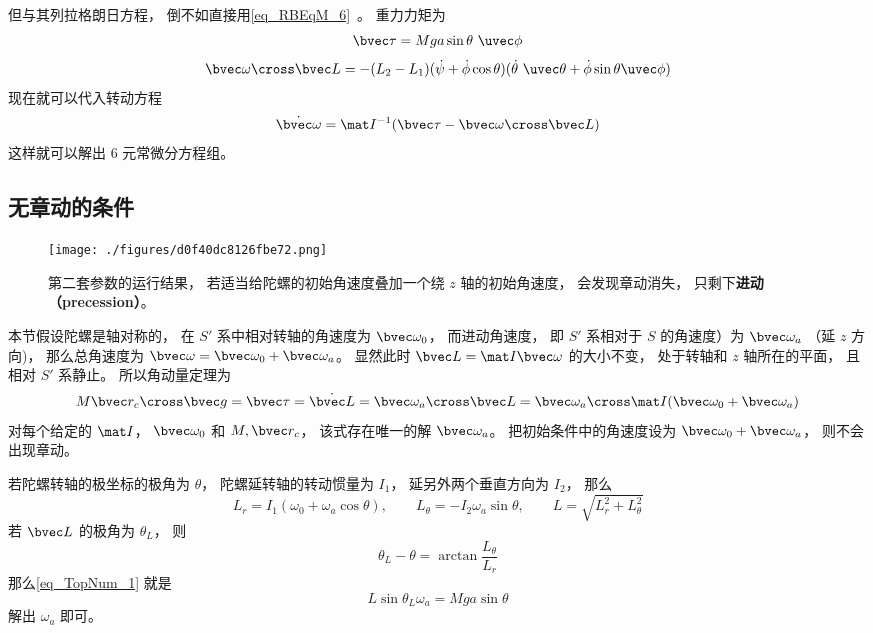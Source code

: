 但与其列拉格朗日方程， 倒不如直接用\autoref{eq_RBEqM_6}~。 重力力矩为
\begin{equation}
\bvec\tau = Mga\sin\theta\ \uvec\phi
\end{equation}
\begin{equation}
\bvec\omega\cross\bvec L = -(L_2-L_1)(\dot\psi + \dot\phi\cos\theta)(\dot\theta\ \uvec\theta  + \dot\phi\sin\theta\uvec\phi)
\end{equation}
现在就可以代入转动方程
\begin{equation}
\dot{\bvec\omega} = \mat I^{-1}(\bvec\tau - \bvec\omega\cross\bvec L)
\end{equation}
这样就可以解出 6 元常微分方程组。

\subsection{无章动的条件}

\begin{figure}[ht]
\centering
\texttt{[image: ./figures/d0f40dc8126fbe72.png]}
\caption{第二套参数的运行结果， 若适当给陀螺的初始角速度叠加一个绕 $z$ 轴的初始角速度， 会发现章动消失， 只剩下\textbf{进动（precession）}。} \label{fig_TopNum_2}
\end{figure}

本节假设陀螺是轴对称的， 在 $S'$ 系中相对转轴的角速度为 $\bvec\omega_0$， 而进动角速度， 即 $S'$ 系相对于 $S$ 的角速度）为 $\bvec\omega_a$ （延 $z$ 方向)， 那么总角速度为 $\bvec\omega = \bvec\omega_0 + \bvec\omega_a$。 显然此时 $\bvec L = \mat I \bvec\omega$ 的大小不变， 处于转轴和 $z$ 轴所在的平面， 且相对 $S'$ 系静止。 所以角动量定理为
\begin{equation}\label{eq_TopNum_1}
M\bvec r_c\cross \bvec g = \bvec\tau = \dot{\bvec L} = \bvec\omega_a\cross\bvec L = \bvec\omega_a\cross \mat I (\bvec\omega_0 + \bvec\omega_a)
\end{equation}
对每个给定的 $\mat I$， $\bvec\omega_0$ 和 $M, \bvec r_c$， 该式存在唯一的解 $\bvec\omega_a$。 把初始条件中的角速度设为 $\bvec\omega_0 + \bvec\omega_a$， 则不会出现章动。

若陀螺转轴的极坐标的极角为 $\theta$， 陀螺延转轴的转动惯量为 $I_1$， 延另外两个垂直方向为 $I_2$， 那么
\begin{equation}
L_r = I_1(\omega_0+\omega_a\cos\theta), \qquad
L_\theta = -I_2\omega_a\sin\theta, \qquad
L = \sqrt{L_r^2 + L_\theta^2}
\end{equation}
若 $\bvec L$ 的极角为 $\theta_L$， 则
\begin{equation}
\theta_L - \theta = \arctan\frac{L_\theta}{L_r}
\end{equation}
那么\autoref{eq_TopNum_1} 就是
\begin{equation}
L\sin\theta_L \omega_a = Mga\sin\theta
\end{equation}
解出 $\omega_a$ 即可。

